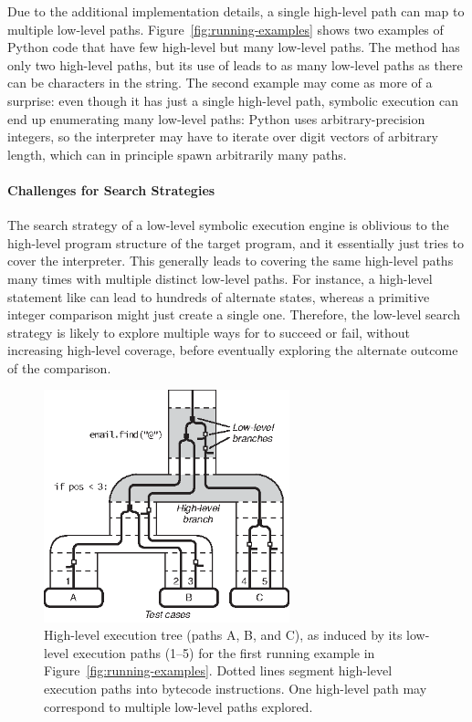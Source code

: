 Due to the additional implementation details, a single high-level path can map to multiple low-level paths.
%
Figure~\ref{fig:running-examples} shows two examples of Python code that have few high-level but many low-level paths. The  method has only two high-level paths, but its use of  leads to as many low-level paths as there can be characters in the  string.
%
The second example  may come as more of a surprise: even though it has just a single high-level path, symbolic execution can end up enumerating many low-level paths: Python uses arbitrary-precision integers, so the interpreter may have to iterate over digit vectors of arbitrary length, which can in principle spawn arbitrarily many paths.


\paragraph{Challenges for Search Strategies}
%
The search strategy of a low-level symbolic execution engine is oblivious to the high-level program structure of the target program, and it essentially just tries to cover the interpreter. This generally leads to covering the same high-level paths many times with multiple distinct low-level paths.
%
For instance, a high-level statement like  can lead to hundreds of alternate states, whereas a primitive integer comparison might just create a single one. Therefore, the low-level search strategy is likely to explore multiple ways for  to succeed or fail, without increasing high-level coverage, before eventually exploring the alternate outcome of the comparison.

\begin{figure}
  \centering
  \includegraphics[width=2.8in]{figures/chef/hl-symbex}
  \caption{High-level execution tree (paths A, B, and C), as induced by its low-level execution paths (1--5) for the first running example in Figure~\ref{fig:running-examples}.  Dotted lines segment high-level execution paths into bytecode instructions.  One high-level path may correspond to multiple low-level paths explored.}
  \label{fig:hl-symbex}
\end{figure}

